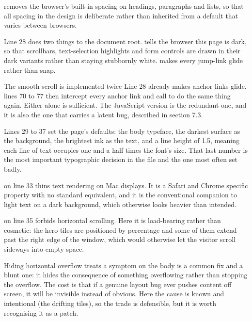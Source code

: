  removes the browser's built-in spacing on headings,
paragraphs and lists, so that all spacing in the design is deliberate rather than
inherited from a default that varies between browsers.

Line 28 does two things to the document root.  tells the
browser this page is dark, so that scrollbars, text-selection highlights and form
controls are drawn in their dark variants rather than staying stubbornly white.
 makes every jump-link glide rather than snap.

\begin{honest}{The smooth scroll is implemented twice}
Line 28 already makes anchor links glide.  lines 70 to 77 then
intercept every anchor link and call 
to do the same thing again. Either alone is sufficient. The JavaScript version is
the redundant one, and it is also the one that carries a latent bug, described in
section 7.3.
\end{honest}

Lines 29 to 37 set the page's defaults: the body typeface, the darkest surface as
the background, the brightest ink as the text, and a line height of 1.5, meaning
each line of text occupies one and a half times the font's size. That last number
is the most important typographic decision in the file and the one most often set
badly.

 on line 33 thins text rendering on Mac
displays. It is a Safari and Chrome specific property with no standard equivalent,
and it is the conventional companion to light text on a dark background, which
otherwise looks heavier than intended.

 on line 35 forbids horizontal scrolling. Here it is
load-bearing rather than cosmetic: the hero tiles are positioned by percentage and
some of them extend past the right edge of the window, which would otherwise let
the visitor scroll sideways into empty space.

\begin{honest}{Hiding horizontal overflow treats a symptom}
 on the body is a common fix and a blunt one: it hides
the consequence of something overflowing rather than stopping the overflow. The
cost is that if a genuine layout bug ever pushes content off screen, it will be
invisible instead of obvious. Here the cause is known and intentional (the drifting
tiles), so the trade is defensible, but it is worth recognising it as a patch.
\end{honest}


